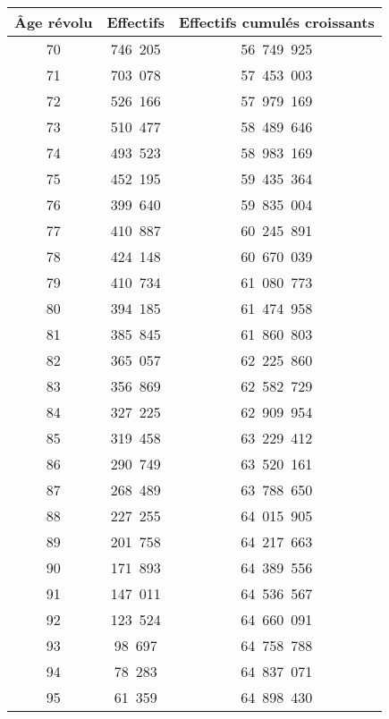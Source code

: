 \begin{center}
     \begin{tabular}{|c|c|c|}\hline %
          \textbf{Âge révolu}  &  \textbf{Effectifs}  &  \textbf{Effectifs cumulés croissants} \\ \hline
          70  &  746~205  &  56~749~925 \\ \hline
          71  &  703~078  &  57~453~003 \\ \hline
          72  &  526~166  &  57~979~169 \\ \hline
          73  &  510~477  &  58~489~646 \\ \hline
          74  &  493~523  &  58~983~169 \\ \hline
          75  &  452~195  &  59~435~364 \\ \hline
          76  &  399~640  &  59~835~004 \\ \hline
          77  &  410~887  &  60~245~891 \\ \hline
          78  &  424~148  &  60~670~039 \\ \hline
          79  &  410~734  &  61~080~773 \\ \hline
          80  &  394~185  &  61~474~958 \\ \hline
          81  &  385~845  &  61~860~803 \\ \hline
          82  &  365~057  &  62~225~860 \\ \hline
          83  &  356~869  &  62~582~729 \\ \hline
          84  &  327~225  &  62~909~954 \\ \hline
          85  &  319~458  &  63~229~412 \\ \hline
          86  &  290~749  &  63~520~161 \\ \hline
          87  &  268~489  &  63~788~650 \\ \hline
          88  &  227~255  &  64~015~905 \\ \hline
          89  &  201~758  &  64~217~663 \\ \hline
          90  &  171~893  &  64~389~556 \\ \hline
          91  &  147~011  &  64~536~567 \\ \hline
          92  &  123~524  &  64~660~091 \\ \hline
          93  &  98~697  &  64~758~788 \\ \hline
          94  &  78~283  &  64~837~071 \\ \hline
          95  &  61~359  &  64~898~430 \\ \hline

\end{tabular}
\end{center}
